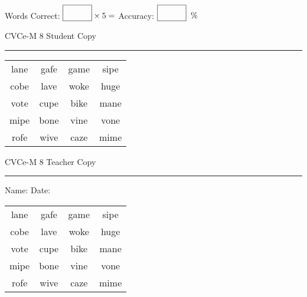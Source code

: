 \documentclass{memoir}
\begin{document}
\small

Words Correct: $\fbox{\phantom{\huge 100}} \times 5 = $ Accuracy: $\fbox{\phantom{\huge 100}}\;\; \%$ 

\vfill

\newpage


\footnotesize \noindent
CVCe-M 8 \hfill Student Copy
\smallskip
\hrule

\Large

\setlength{\tabcolsep}{14pt}
\def\arraystretch{2}

{\selectfont


\begin{vplace}[0.5]
\begin{center}
\begin{tabular}{cccc}
lane & gafe & game & sipe \\
cobe & lave & woke & huge \\
vote & cupe & bike & mane \\
mipe & bone & vine & vone \\
rofe & wive & caze & mime \\
\end{tabular}
\end{center}
\end{vplace}

}

\newpage

\footnotesize \noindent
CVCe-M 8 \hfill Teacher Copy
\smallskip
\hrule

\small

\vfill

\noindent
Name: \underline{\hspace{1.75in}} \hfill Date: \underline{\hspace{1in}}

\Large

{\selectfont


\begin{vplace}[0.5]
\begin{center}
\begin{tabular}{cccc}
lane & gafe & game & sipe \\
cobe & lave & woke & huge \\
vote & cupe & bike & mane \\
mipe & bone & vine & vone \\
rofe & wive & caze & mime \\
\end{tabular}
\end{center}
\end{vplace}



}
\end{document}
